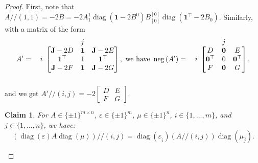 \documentclass[11pt,a4paper]{amsart}
\theoremstyle{plain}
\newtheorem{claim}[theorem]{Claim}
\theoremstyle{definition}
\newcommand{\F}{\mathbb{F}}
\newcommand{\trim}{/\!\!/}
\DeclareMathOperator{\diag}{diag}
\DeclareMathOperator{\nega}{neg}
\begin{document}
\begin{proof}
First, note that $A\trim(1,1) = -2B = -2A_1^1 \diag(\mathbf{1}-2B^0) B_{[0]}^{[0]}\diag(\mathbf{1}^\top-2B_0)$.
Similarly, with a matrix of the form
\begin{equation}\label{equation:nice_form}
A'=\begin{array}{c@{}c}
	& \begin{array}{ccc}
		& j & 
	\end{array}\\
	\begin{array}{c}
		\\i \\  \\
	\end{array} &\begin{bmatrix}
		\mathbf{J}-2D & \mathbf{1} & \mathbf{J}-2E\\
		\mathbf{1}^\top & 1 & \mathbf{1}^\top\\
		\mathbf{J}-2F & \mathbf{1} & \mathbf{J}-2G
	\end{bmatrix}\\&\end{array}\!\!, \text{ we have } \nega{(A')}=\begin{array}{c@{}c}
	& \begin{array}{ccc}
		& j & 
	\end{array}\\
	\begin{array}{c}
		\\i \\  \\
	\end{array} &\begin{bmatrix}
		D & \mathbf{0} & E\\
		\mathbf{0}^\top & 0 & \mathbf{0}^\top\\
		F & \mathbf{0} & G
	\end{bmatrix}\\&\end{array}\!\!,
	\end{equation}
	and we get $A'\trim(i,j) = -2\begin{bmatrix}
D&E\\F&G
\end{bmatrix}$.
\begin{claim}
For $A\in\{\pm1\}^{m\times n}$, $\varepsilon\in\{\pm1\}^m$, $\mu\in\{\pm1\}^n$, $i\in\{1,\ldots,m\}$, and $j\in\{1,\ldots,n\}$, we have:
\begin{equation}\label{equation:diag_trim_col}
	\left(\diag(\varepsilon)A\diag(\mu)\right)\trim(i,j) = \diag(\varepsilon_{\widehat{i}})(A\trim(i,j))\diag(\mu_{\widehat{j}}).
\end{equation}


\end{claim}
\end{proof}
\end{document}
